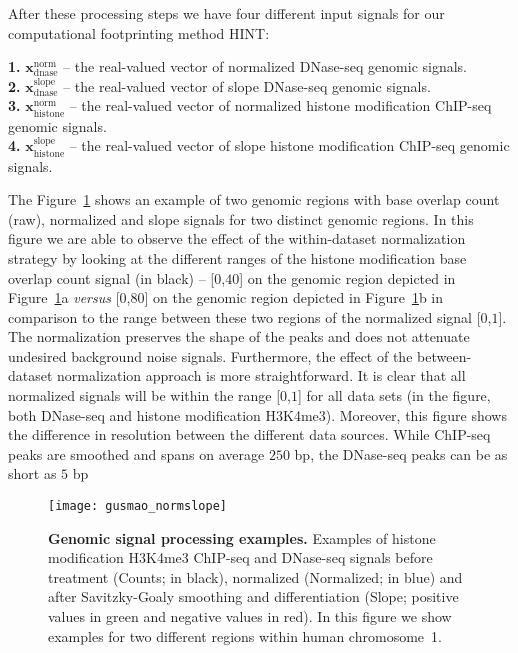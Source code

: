 After these processing steps we have four different input signals for our computational footprinting method HINT:

\vspace{0.3cm}
\noindent
\textbf{1.} $\mathbf{x}^{\text{norm}}_{\text{dnase}}$ -- the real-valued vector of normalized DNase-seq genomic signals. \vspace{0.2cm} \\
\textbf{2.} $\mathbf{x}^{\text{slope}}_{\text{dnase}}$ -- the real-valued vector of slope DNase-seq genomic signals. \vspace{0.2cm} \\
\textbf{3.} $\mathbf{x}^{\text{norm}}_{\text{histone}}$ -- the real-valued vector of normalized histone modification ChIP-seq genomic signals. \vspace{0.2cm} \\
\textbf{4.} $\mathbf{x}^{\text{slope}}_{\text{histone}}$ -- the real-valued vector of slope histone modification ChIP-seq genomic signals. \\
\vspace{0.3cm}

The Figure~\ref{fig:gusmao_normslope} shows an example of two genomic regions with base overlap count (raw), normalized and slope signals for two distinct genomic regions. In this figure we are able to observe the effect of the within-dataset normalization strategy by looking at the different ranges of the histone modification base overlap count signal (in black) -- [$0$,$40$] on the genomic region depicted in Figure~\ref{fig:gusmao_normslope}a \emph{versus} [$0$,$80$] on the genomic region depicted in Figure~\ref{fig:gusmao_normslope}b in comparison to the range between these two regions of the normalized signal [$0$,$1$]. The normalization preserves the shape of the peaks and does not attenuate undesired background noise signals. Furthermore, the effect of the between-dataset normalization approach is more straightforward. It is clear that all normalized signals will be within the range [$0$,$1$] for all data sets (in the figure, both DNase-seq and histone modification H3K4me3). Moreover, this figure shows the difference in resolution between the different data sources. While ChIP-seq peaks are smoothed and spans on average $250$ bp, the DNase-seq peaks can be as short as $5$ bp

\begin{figure}[h!]
\centering
\texttt{[image: gusmao\_normslope]}
\caption[Genomic signal processing examples]{\textbf{Genomic signal processing examples.} Examples of histone modification H3K4me3 ChIP-seq and DNase-seq signals before treatment (Counts; in black), normalized (Normalized; in blue) and after Savitzky-Goaly smoothing and differentiation (Slope; positive values in green and negative values in red). In this figure we show examples for two different regions within human chromosome~1.}
\label{fig:gusmao_normslope}
\end{figure}

